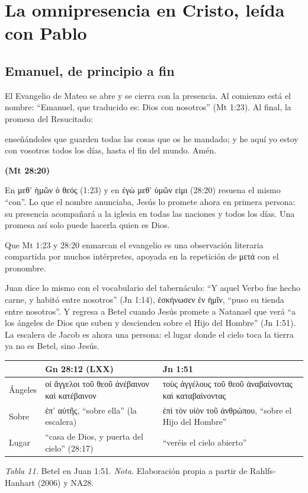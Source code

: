 \documentclass[11pt,letterpaper]{article}
\newcommand{\grc}[1]{\foreignlanguage{ancientgreek}{#1}}
\newcommand{\fuente}[1]{\par\hfill{\upshape\bfseries\small\textcolor{azul}{#1}}}
\begin{document}
\section{La omnipresencia en Cristo, leída con Pablo}\label{sec:cristo-omni}

\subsection{Emanuel, de principio a fin}

El Evangelio de Mateo se abre y se cierra con la presencia. Al comienzo está el nombre: ``Emanuel, que traducido es: Dios con nosotros'' (Mt 1:23). Al final, la promesa del Resucitado:

\begin{cita}enseñándoles que guarden todas las cosas que os he mandado; y he aquí yo estoy con vosotros todos los días, hasta el fin del mundo. Amén.\fuente{(Mt 28:20)}\end{cita}

En \grc{μεθ’ ἡμῶν ὁ θεός} (1:23) y en \grc{ἐγὼ μεθ’ ὑμῶν εἰμι} (28:20) resuena el mismo ``con''. Lo que el nombre anunciaba, Jesús lo promete ahora en primera persona: su presencia acompañará a la iglesia en todas las naciones y todos los días. Una promesa así solo puede hacerla quien es Dios.

\begin{nota}[Precisión]
Que Mt 1:23 y 28:20 enmarcan el evangelio es una observación literaria compartida por muchos intérpretes, apoyada en la repetición de \grc{μετά} con el pronombre.
\end{nota}

Juan dice lo mismo con el vocabulario del tabernáculo: ``Y aquel Verbo fue hecho carne, y habitó entre nosotros'' (Jn 1:14), \grc{ἐσκήνωσεν ἐν ἡμῖν}, ``puso su tienda entre nosotros''. Y regresa a Betel cuando Jesús promete a Natanael que verá ``a los ángeles de Dios que suben y descienden sobre el Hijo del Hombre'' (Jn 1:51). La escalera de Jacob es ahora una persona: el lugar donde el cielo toca la tierra ya no es Betel, sino Jesús.

\begin{center}\small\renewcommand{\arraystretch}{1.2}
\begin{tabular}{@{}L{2.4cm}L{5.8cm}L{5.8cm}@{}}
\toprule
 & \textbf{Gn 28:12 (LXX)} & \textbf{Jn 1:51} \\ \midrule
Ángeles & \grc{οἱ ἄγγελοι τοῦ θεοῦ ἀνέβαινον καὶ κατέβαινον} & \grc{τοὺς ἀγγέλους τοῦ θεοῦ ἀναβαίνοντας καὶ καταβαίνοντας} \\
Sobre & \grc{ἐπ’ αὐτῆς}, ``sobre ella'' (la escalera) & \grc{ἐπὶ τὸν υἱὸν τοῦ ἀνθρώπου}, ``sobre el Hijo del Hombre'' \\
Lugar & ``casa de Dios, y puerta del cielo'' (28:17) & ``veréis el cielo abierto'' \\
\bottomrule
\end{tabular}\par
{\footnotesize\color{gris}\textit{Tabla 11.} Betel en Juan 1:51. \textit{Nota.} Elaboración propia a partir de Rahlfs-Hanhart (2006) y NA28.}
\end{center}
\end{document}
